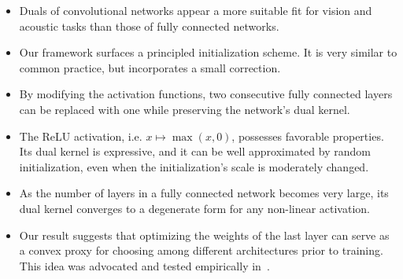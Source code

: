 \begin{itemize}

\item Duals of convolutional networks appear a more suitable fit for
	vision and acoustic tasks than those of fully connected networks.

\item Our framework surfaces a principled initialization scheme. It is
	very similar to common practice, but incorporates a small correction.

\item By modifying the activation functions, two consecutive fully connected
	layers can be replaced with one while preserving the network's dual kernel.

\item The ReLU activation, i.e. $x \mapsto \max(x,0)$, possesses favorable
	properties. Its dual kernel is expressive, and it can be well approximated by
	random initialization, even when the initialization's scale is moderately
	changed.

\item As the number of layers in a fully connected network becomes very
	large, its dual kernel converges to a degenerate form for any non-linear
	activation.

\item Our result suggests that optimizing the weights of the last layer can
	serve as a convex proxy for choosing among different architectures prior
	to training. This idea was advocated and tested empirically
	in~\cite{saxe2011random}.

\end{itemize}
